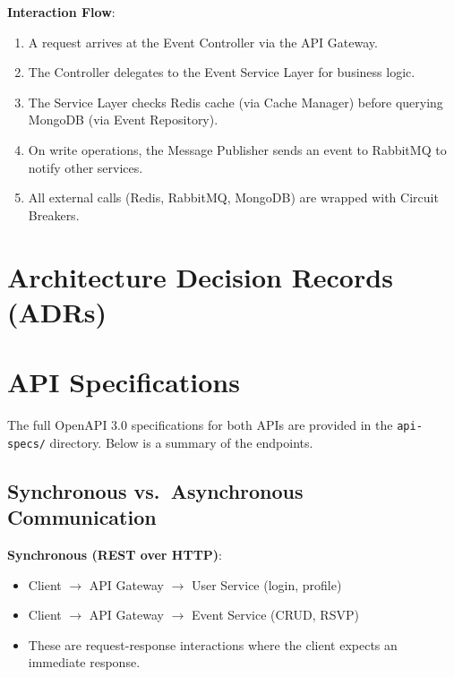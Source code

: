 \documentclass[12pt,a4paper]{article}
\begin{document}
\textbf{Interaction Flow}:
\begin{enumerate}
    \item A request arrives at the Event Controller via the API Gateway.
    \item The Controller delegates to the Event Service Layer for business logic.
    \item The Service Layer checks Redis cache (via Cache Manager) before querying MongoDB (via Event Repository).
    \item On write operations, the Message Publisher sends an event to RabbitMQ to notify other services.
    \item All external calls (Redis, RabbitMQ, MongoDB) are wrapped with Circuit Breakers.
\end{enumerate}

\newpage

\section{Architecture Decision Records (ADRs)}








\newpage

\section{API Specifications}

The full OpenAPI 3.0 specifications for both APIs are provided in the \texttt{api-specs/} directory. Below is a summary of the endpoints.

\subsection{Synchronous vs.\ Asynchronous Communication}

\textbf{Synchronous (REST over HTTP)}:
\begin{itemize}
    \item Client $\rightarrow$ API Gateway $\rightarrow$ User Service (login, profile)
    \item Client $\rightarrow$ API Gateway $\rightarrow$ Event Service (CRUD, RSVP)
    \item These are request-response interactions where the client expects an immediate response.
\end{itemize}
\end{document}
